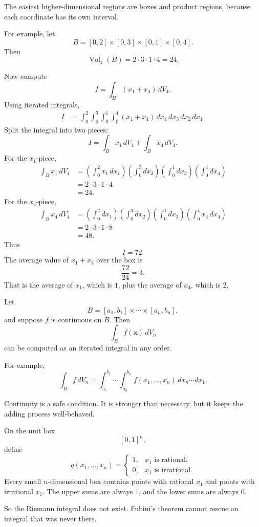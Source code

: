 The easiest higher-dimensional regions are boxes and product regions, because each
coordinate has its own interval.

For example, let
\[
    B=[0,2]\times[0,3]\times[0,1]\times[0,4].
\]
Then
\[
    \operatorname{Vol}_4(B)=2\cdot3\cdot1\cdot4=24.
\]

Now compute
\[
    I=\int_B (x_1+x_4)\,dV_4.
\]
Using iterated integrals,
\[
\begin{aligned}
I
&=
\int_0^2\int_0^3\int_0^1\int_0^4
(x_1+x_4)\,dx_4\,dx_3\,dx_2\,dx_1.
\end{aligned}
\]
Split the integral into two pieces:
\[
    I
    =
    \int_B x_1\,dV_4+\int_B x_4\,dV_4.
\]
For the \(x_1\)-piece,
\[
\begin{aligned}
\int_B x_1\,dV_4
&=
\left(\int_0^2 x_1\,dx_1\right)
\left(\int_0^3 dx_2\right)
\left(\int_0^1 dx_3\right)
\left(\int_0^4 dx_4\right)\\
&=
2\cdot3\cdot1\cdot4\\
&=
24.
\end{aligned}
\]
For the \(x_4\)-piece,
\[
\begin{aligned}
\int_B x_4\,dV_4
&=
\left(\int_0^2 dx_1\right)
\left(\int_0^3 dx_2\right)
\left(\int_0^1 dx_3\right)
\left(\int_0^4 x_4\,dx_4\right)\\
&=
2\cdot3\cdot1\cdot8\\
&=
48.
\end{aligned}
\]
Thus
\[
\boxed{
    I=72.
}
\]
The average value of \(x_1+x_4\) over the box is
\[
    \frac{72}{24}=3.
\]
That is the average of \(x_1\), which is \(1\), plus the average of \(x_4\), which is
\(2\).

\begin{theorem}
Let
\[
    B=[a_1,b_1]\times\cdots\times[a_n,b_n],
\]
and suppose \(f\) is continuous on \(B\).  Then
\[
\boxed{
    \int_B f(\mathbf x)\,dV_n
}
\]
can be computed as an iterated integral in any order.

For example,
\[
\boxed{
\int_B f\,dV_n
=
\int_{a_1}^{b_1}\cdots\int_{a_n}^{b_n}
f(x_1,\ldots,x_n)\,dx_n\cdots dx_1.
}
\]
\end{theorem}

Continuity is a safe condition.  It is stronger than necessary, but it keeps the adding
process well-behaved.

\begin{example}
On the unit box
\[
    [0,1]^n,
\]
define
\[
    q(x_1,\ldots,x_n)
    =
    \begin{cases}
    1, & x_1\text{ is rational},\\
    0, & x_1\text{ is irrational}.
    \end{cases}
\]
Every small \(n\)-dimensional box contains points with rational \(x_1\) and points with
irrational \(x_1\).  The upper sums are always \(1\), and the lower sums are always
\(0\).

So the Riemann integral does not exist.  Fubini's theorem cannot rescue an integral
that was never there.
\end{example}

